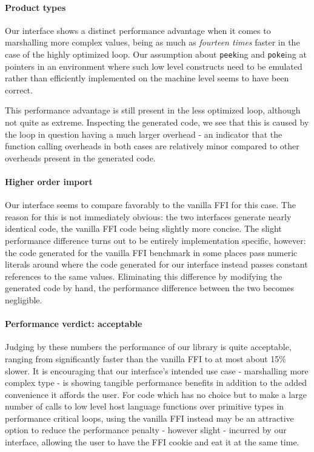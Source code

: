 \documentclass[preprint]{sigplanconf}
\begin{document}
\paragraph{Product types}
Our interface shows a distinct performance advantage when it comes to
marshalling more complex values, being as much as \emph{fourteen times} faster
in the case of the highly optimized loop. Our assumption about
\lstinline!peek!ing and \lstinline!poke!ing at pointers in an environment where
such low level constructs need to be emulated rather than efficiently
implemented on the machine level seems to have been correct.

This performance advantage is still present in the less optimized loop,
although not quite as extreme. Inspecting the generated code,
we see that this is caused by the loop in question having a
much larger overhead - an indicator that the function calling overheads in
both cases are relatively minor compared to other overheads present in the
generated code.

\paragraph{Higher order import}
Our interface seems to compare favorably to the vanilla FFI for this case.
The reason for this is not immediately obvious: the two interfaces generate
nearly identical code, the vanilla FFI code being slightly more concise.
The slight performance difference turns out to be entirely implementation
specific, however: the code generated for the vanilla FFI benchmark in some
places pass numeric literals around where the code generated for our
interface instead passes constant references to the same values.
Eliminating this difference by modifying the generated code by hand, the
performance difference between the two becomes negligible.

\paragraph{Performance verdict: acceptable}
Judging by these numbers the performance of our library is quite acceptable,
ranging from significantly faster than the vanilla FFI to at most about 15\%
slower. It is encouraging that our interface's intended use case - marshalling
more complex type - is showing tangible performance benefits in addition to
the added convenience it affords the user.
For code which has no choice but to make a large number of calls to
low level host language functions over primitive types in performance critical
loops, using the vanilla FFI instead may be an attractive option to
reduce the performance penalty - however slight - incurred by our
interface, allowing the user to have the FFI cookie and eat it at the same time.
\end{document}
